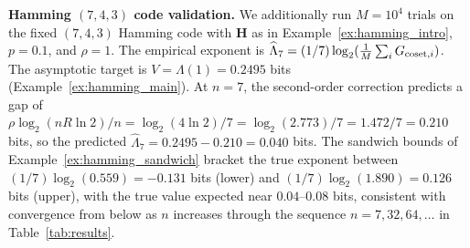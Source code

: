 \documentclass[journal,10pt,onecolumn]{IEEEtran}
\newcommand{\Hm}{\mathbf{H}}
\begin{document}
\noindent\textbf{Hamming $(7,4,3)$ code validation.}
We additionally run $M=10^4$ trials on the fixed $(7,4,3)$ Hamming
code with $\Hm$ as in Example~\ref{ex:hamming_intro},
$p=0.1$, and $\rho=1$.
The empirical exponent is
$\widehat{\Lambda}_7=(1/7)\log_2(\frac{1}{M}\sum_i G_{{\rm coset},i})$.
The asymptotic target is $V=\Lambda(1) = 0.2495$ bits
(Example~\ref{ex:hamming_main}).
At $n=7$, the second-order correction predicts a gap of
$\rho\log_2(nR\ln 2)/n=\log_2(4\ln 2)/7
 = \log_2(2.773)/7 = 1.472/7 = 0.210$ bits,
so the predicted $\widehat{\Lambda}_7 = 0.2495-0.210=0.040$ bits.
The sandwich bounds of Example~\ref{ex:hamming_sandwich}
bracket the true exponent between
$(1/7)\log_2(0.559) = -0.131$ bits (lower)
and $(1/7)\log_2(1.890) = 0.126$ bits (upper),
with the true value expected near $0.04$--$0.08$ bits,
consistent with convergence from below as $n$ increases through
the sequence $n=7,32,64,\ldots$ in Table~\ref{tab:results}.



\end{document}
